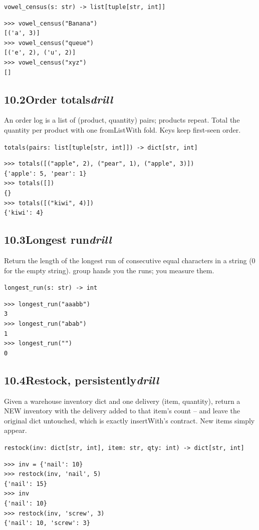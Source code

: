 \documentclass[10pt,letterpaper]{book}
\begin{document}
\noindent\texttt{vowel\_census(s: str) -> list[tuple[str, int]]}
\begin{lstlisting}[style=ex]
>>> vowel_census("Banana")
[('a', 3)]
>>> vowel_census("queue")
[('e', 2), ('u', 2)]
>>> vowel_census("xyz")
[]
\end{lstlisting}
\subsection*{10.2\quad Order totals\hfill\textnormal{\textit{drill}}}
An order log is a list of (product, quantity) pairs; products repeat. Total the quantity per product with one fromListWith fold. Keys keep first-seen order.

\noindent\texttt{totals(pairs: list[tuple[str, int]]) -> dict[str, int]}
\begin{lstlisting}[style=ex]
>>> totals([("apple", 2), ("pear", 1), ("apple", 3)])
{'apple': 5, 'pear': 1}
>>> totals([])
{}
>>> totals([("kiwi", 4)])
{'kiwi': 4}
\end{lstlisting}
\subsection*{10.3\quad Longest run\hfill\textnormal{\textit{drill}}}
Return the length of the longest run of consecutive equal characters in a string (0 for the empty string). group hands you the runs; you measure them.

\noindent\texttt{longest\_run(s: str) -> int}
\begin{lstlisting}[style=ex]
>>> longest_run("aaabb")
3
>>> longest_run("abab")
1
>>> longest_run("")
0
\end{lstlisting}
\subsection*{10.4\quad Restock, persistently\hfill\textnormal{\textit{drill}}}
Given a warehouse inventory dict and one delivery (item, quantity), return a NEW inventory with the delivery added to that item's count -- and leave the original dict untouched, which is exactly insertWith's contract. New items simply appear.

\noindent\texttt{restock(inv: dict[str, int], item: str, qty: int) -> dict[str, int]}
\begin{lstlisting}[style=ex]
>>> inv = {'nail': 10}
>>> restock(inv, 'nail', 5)
{'nail': 15}
>>> inv
{'nail': 10}
>>> restock(inv, 'screw', 3)
{'nail': 10, 'screw': 3}
\end{lstlisting}
\end{document}
